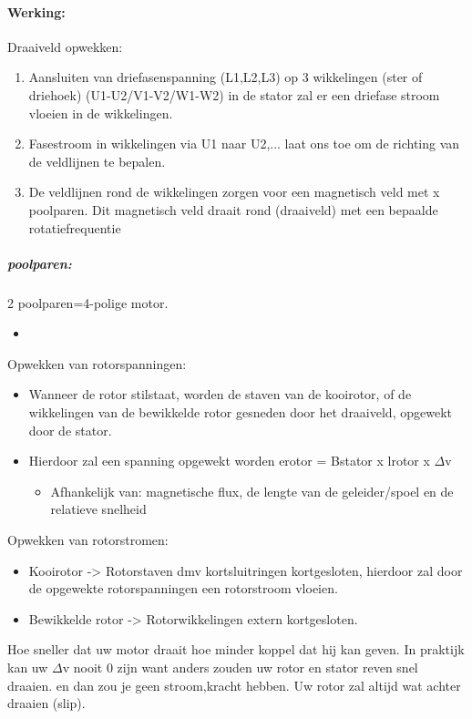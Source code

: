 \documentclass[12pt]{article}
\begin{document}
\paragraph{Werking:}
Draaiveld opwekken:\begin{enumerate}
    \item Aansluiten van driefasenspanning (L1,L2,L3)
 op 3 wikkelingen (ster of driehoek) (U1-U2/V1-V2/W1-W2) in de stator zal er een driefase stroom vloeien in de wikkelingen.
    \item Fasestroom in wikkelingen via U1 naar U2,... laat ons toe om de richting van de veldlijnen te bepalen.
    \item De veldlijnen rond de wikkelingen zorgen voor een magnetisch veld met x poolparen. Dit magnetisch veld draait rond (draaiveld) met een bepaalde rotatiefrequentie
\end{enumerate}
\subparagraph{poolparen:}
2 poolparen=4-polige motor.\begin{itemize}
    \item 
\end{itemize}
Opwekken van rotorspanningen:\begin{itemize}
    \item Wanneer de rotor stilstaat, worden de staven van de kooirotor, of de
    wikkelingen van de bewikkelde rotor gesneden door het draaiveld, opgewekt
    door de stator.
    \item Hierdoor zal een spanning opgewekt worden erotor = Bstator x lrotor x $\Delta$v\begin{itemize}
        \item Afhankelijk van: magnetische flux, de lengte van de geleider/spoel en de relatieve snelheid
    \end{itemize}
\end{itemize}
Opwekken van rotorstromen:\begin{itemize}
    \item Kooirotor -> Rotorstaven dmv kortsluitringen kortgesloten, hierdoor zal door de opgewekte rotorspanningen een rotorstroom vloeien.
    \item Bewikkelde rotor -> Rotorwikkelingen extern kortgesloten.
\end{itemize}
Hoe sneller dat uw motor draait hoe minder koppel dat hij kan geven. In praktijk kan uw $\Delta$v nooit 0 zijn want anders zouden uw rotor en stator reven snel draaien. en dan zou je geen stroom,kracht hebben. Uw rotor zal altijd wat achter draaien (slip).
\end{document}
